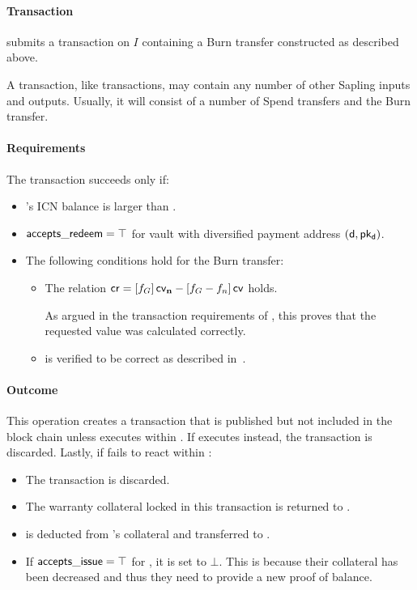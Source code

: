 \paragraph{Transaction}
\redeemer submits a \burn transaction on $I$ containing a Burn transfer constructed as described above.

A \burn transaction, like \mint transactions, may contain any number of other Sapling inputs and outputs.
Usually, it will consist of a number of Spend transfers and the Burn transfer.

\paragraph{Requirements}
The \burn transaction succeeds only if:
\begin{itemize}
    \item \redeemer's ICN balance is larger than \iw.
    
    \item $\mathsf{accepts\_redeem} = \top$ for vault \vault with diversified payment address $(\mathsf{d}, \mathsf{pk_d})$.
    
    \item The following conditions hold for the Burn transfer:
    \begin{itemize}
        \item The relation $\mathsf{cr} = [f_G]\,\mathsf{cv_{\mathbf{n}}} - [f_G - f_n]\,\mathsf{cv}$ holds.
        
        As argued in the transaction requirements of \mintop, this proves that the requested value \valn was calculated correctly.
    
        \item \pib is verified to be correct as described in~\cite[Appendix B.2]{hopwood2016zcash}.
    \end{itemize}
\end{itemize}

\paragraph{Outcome}
This operation creates a \burn transaction that is published but not included in the block chain unless \vault executes \confirmRedeemop within \dcr.
If \vault executes \challengeRedeemop instead, the transaction is discarded.
Lastly, if \vault fails to react within \dcr:
\begin{itemize}
    \item The \burn transaction is discarded.
    \item The warranty collateral \iw locked in this transaction is returned to \redeemer.
    \item \iw is deducted from \vault's collateral and transferred to \redeemer.
    \item If $\mathsf{accepts\_issue} = \top$ for \vault, it is set to $\bot$.
    This is because their collateral has been decreased and thus they need to provide a new proof of balance.
\end{itemize}

